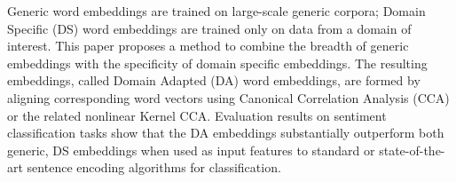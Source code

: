 Generic word embeddings are trained on large-scale generic corpora; Domain Specific (DS) word embeddings are trained only on data from a domain of interest. This paper proposes a method to combine the breadth of generic embeddings with the specificity of domain specific embeddings. The resulting embeddings, called Domain Adapted (DA) word embeddings, are formed by aligning corresponding word vectors using Canonical Correlation Analysis (CCA) or the related nonlinear Kernel CCA. Evaluation results on sentiment classification tasks show that the DA embeddings substantially outperform both generic, DS embeddings when used as input features to standard or state-of-the-art sentence encoding algorithms for classification.
